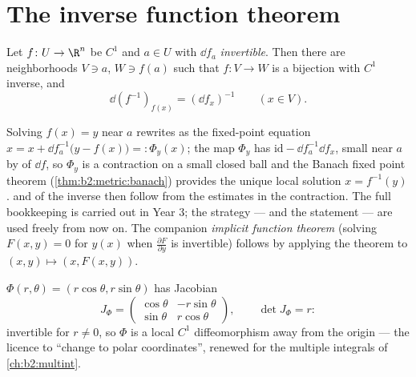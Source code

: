 \section{The inverse function theorem}

\begin{theorem}\label{thm:b2:diffcalc:inverse}
Let $f \colon U \to \R^n$ be $C^1$ and $a \in U$ with $\dd f_a$
\emph{invertible}. Then there are  neighborhoods $V \ni a$, $W
\ni f(a)$ such that $f \colon V \to W$ is a bijection with $C^1$
inverse, and
\[
\dd (f^{-1})_{f(x)} = (\dd f_x)^{-1} \qquad (x \in V).
\]
\end{theorem}
\admitted

\begin{remark}
Solving $f(x) = y$ near $a$ rewrites as the fixed-point equation
$x = x + \dd f_a^{-1}\bigl(y - f(x)\bigr) =: \Phi_y(x)$; the map
$\Phi_y$ has  $\mathrm{id} - \dd f_a^{-1}\dd f_x$,
small near $a$ by  of $\dd f$, so $\Phi_y$ is a
contraction on a small closed ball and the Banach fixed point
theorem (\cref{thm:b2:metric:banach}) provides the unique local
solution $x = f^{-1}(y)$.  and  of the
inverse then follow from the estimates in the contraction. The full
bookkeeping is carried out in Year 3; the strategy --- and the
statement --- are used freely from now on. The companion
\emph{implicit function theorem} (solving $F(x, y) = 0$ for $y(x)$
when $\frac{\partial F}{\partial y}$ is invertible) follows by
applying the theorem to $(x, y) \mapsto (x, F(x,y))$.
\end{remark}

\begin{example}\label{ex:b2:diffcalc:polar}
$\Phi(r, \theta) = (r\cos\theta, r\sin\theta)$ has Jacobian
\[
J_\Phi = \begin{pmatrix} \cos\theta & -r\sin\theta\\ \sin\theta &
r\cos\theta \end{pmatrix},
\qquad \det J_\Phi = r :
\]
invertible for $r \neq 0$, so $\Phi$ is a local $C^1$
diffeomorphism away from the origin --- the licence to ``change to
polar coordinates'', renewed for the multiple integrals of
\cref{ch:b2:multint}.
\end{example}

